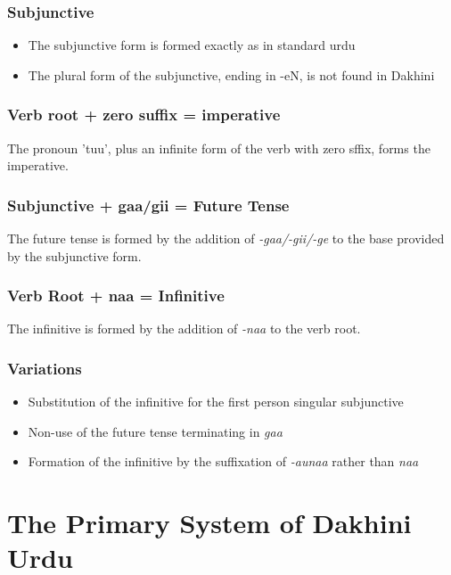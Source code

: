\documentclass[a4paper]{article}
\begin{document}
\subsubsection{Subjunctive}

\begin{itemize}
\item
The subjunctive form is formed exactly as in standard urdu
\item
The plural form of the subjunctive, ending in -eN, is not found in Dakhini
\end{itemize}

\subsubsection{Verb root + zero suffix = imperative}

The pronoun 'tuu', plus an infinite form of the verb with zero sffix, forms the imperative.

\subsubsection{Subjunctive + gaa/gii = Future Tense}

The future tense is formed by the addition of \emph{-gaa/-gii/-ge} to the base provided by the subjunctive form.

\subsubsection{Verb Root + naa = Infinitive}

The infinitive is formed by the addition of \emph{-naa} to the verb root.

\subsubsection{Variations}

\begin{itemize}
\item
Substitution of the infinitive for the first person singular subjunctive
\item
Non-use of the future tense terminating in \textit{gaa}
\item
Formation of the infinitive by the suffixation of \textit{-aunaa} rather than \textit{naa}
\end{itemize}


\section{The Primary System of Dakhini Urdu}
\end{document}
